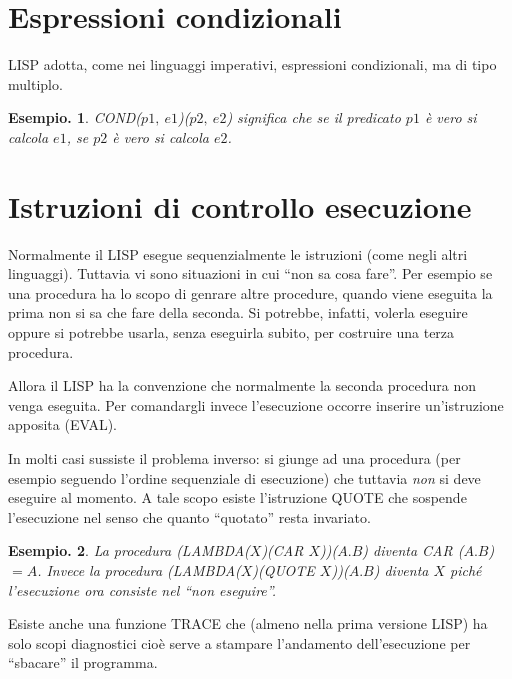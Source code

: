\documentclass{book}
\newtheorem{esempio}{Esempio.}
\begin{document}
\section{Espressioni condizionali}
LISP adotta, come nei linguaggi imperativi, espressioni condizionali, ma di
tipo multiplo.
\begin{esempio}
COND($p1, \ e1$)($p2,\ e2$) significa che se il predicato $p1$ \`e vero si 
calcola $e1$, se $p2$ \`e vero si calcola $e2$.
\end{esempio}

\section{Istruzioni di controllo esecuzione}
Normalmente il LISP esegue sequenzialmente le istruzioni (come negli altri 
linguaggi). Tuttavia vi sono situazioni in cui ``non sa cosa fare''. Per 
esempio se una procedura ha lo scopo di genrare altre procedure, quando viene 
eseguita la prima non si sa che fare della seconda. Si potrebbe, infatti, 
volerla eseguire oppure si potrebbe usarla, senza eseguirla subito, per 
costruire una terza procedura.

Allora il LISP ha la convenzione che normalmente la seconda procedura non venga
eseguita. Per comandargli invece l'esecuzione occorre inserire un'istruzione 
apposita (EVAL). 

In molti casi sussiste il problema inverso: si giunge ad una procedura (per 
esempio seguendo l'ordine sequenziale di esecuzione) che tuttavia \emph{non} si
deve eseguire al momento. A tale scopo esiste l'istruzione QUOTE che sospende 
l'esecuzione nel senso che quanto ``quotato'' resta invariato.

\begin{esempio}
La procedura (LAMBDA($X$)(CAR $X$))($A.B$) diventa CAR ($A.B$) $= A$. Invece la
procedura (LAMBDA($X$)(QUOTE $X$))($A.B$) diventa $X$ pich\'e l'esecuzione ora 
consiste nel ``non eseguire''.
\end{esempio}

Esiste anche una funzione TRACE che (almeno nella prima versione LISP) ha solo 
scopi diagnostici cio\`e serve a stampare l'andamento dell'esecuzione per 
``sbacare'' il programma.
\end{document}
